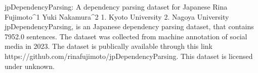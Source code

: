 
jpDependencyParsing: A dependency parsing dataset for Japanese
Rina Fujimoto^1 Yuki Nakamura^2
1. Kyoto University 2. Nagoya University
jpDependencyParsing, is an Japanese dependency parsing dataset, that contains 7952.0 sentences.
The dataset was collected from machine annotation of social media in 2023. 
The dataset is publically available through this link https://github.com/rinafujimoto/jpDependencyParsing. This dataset is licensed under unknown.

